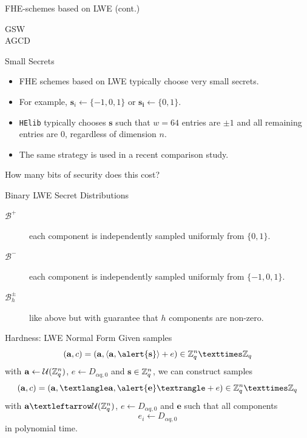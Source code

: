 \documentclass[presentation,smaller]{beamer}
\newcommand{\ZZq}[1][blank]{\ensuremath{\ifthenelse{\equal{#1}{blank}}{\mathbb{Z}_q}{\mathbb{Z}_q\left[#1\right]}\xspace}}
\renewcommand{\vec}[1]{\ensuremath{\mathbf{#1}}\xspace}
\renewcommand{\B}[2][]{\ensuremath{\mathcal{B}_{#1}^{#2}}\xspace}
\begin{document}
\begin{frame}[label={sec:orgheadline4}]{FHE-schemes based on LWE (cont.)}
\footnotesize

\begin{description}
\item[{GSW}] 

\item[{AGCD}] 
\end{description}
\end{frame}

\begin{frame}[fragile,label={sec:orgheadline5}]{Small Secrets}
 \begin{itemize}
\item FHE schemes based on LWE typically choose very small secrets.
\item For example, \(\vec{s}_{i} ← \{-1,0,1\}\) or \(\vec{s_{i}} ← \{0,1\}\).
\item \texttt{HElib}  typically chooses \(\vec{s}\) such that \(w=64\) entries are \(±1\) and all remaining entries are \(0\), regardless of dimension \(n\).
\item The same strategy is used in a recent comparison study.
\end{itemize}

\begin{center}
\alert{How many bits of security does this cost?}
\end{center}
\end{frame}

\begin{frame}[label={sec:orgheadline6}]{Binary LWE Secret Distributions}
\begin{description}
\item[{\(\B{+}\)}] each component is independently sampled uniformly from \(\{0,1\}\).
\item[{\(\B{-}\)}] each component is independently sampled uniformly from \(\{-1,0,1\}\).
\item[{\(\B[h]{±}\)}] like above but with guarantee that \(h\) components are non-zero.
\end{description}
\end{frame}

\begin{frame}[label={sec:orgheadline7}]{Hardness: LWE Normal Form}
Given samples
\[(\vec{a},c)=(\vec{a},\langle\vec{a},\alert{\vec{s}}\rangle+ e) \in \ZZq^n × \ZZq\]
with \(\vec{a} \gets \mathcal{U}(\ZZq^n)\), \(e \gets D_{α q,0}\) and \(\vec{s} \in \ZZq^n\),
we can construct samples
\[(\vec{a}, c)=(\vec{a},⟨\vec{a},\alert{\vec{e}}⟩+ e) \in \ZZq^n × \ZZq\] with
\(\vec{a} ← \mathcal{U}(\ZZq^n)\), \(e ← D_{α q, 0}\) and \alert{\(\vec{e}\)} such that all components \alert{\[e_i ← D_{α q, 0}\]} in polynomial time.
\end{frame}
\end{document}
